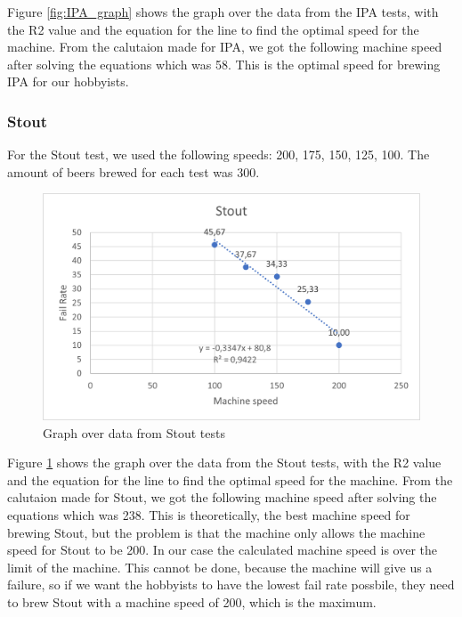 Figure \ref{fig:IPA_graph} shows the graph over the data from the IPA tests, with the R2 value and the equation for the line to find the optimal speed for the machine. \newline
From the calutaion made for IPA, we got the following machine speed after solving the equations which was 58. This is the optimal speed for brewing IPA for our hobbyists. \newline

\subsubsection{Stout}
For the Stout test, we used the following speeds: 200, 175, 150, 125, 100. The amount of beers brewed for each test was 300.

\begin{center}
    \centering
    \begin{figure}[H]
        \includegraphics[width=1\textwidth]{img/Stout_graph.png}
        \caption{Graph over data from Stout tests}
        \label{fig:Stout_graph}
    \end{figure}
\end{center}

Figure \ref{fig:Stout_graph} shows the graph over the data from the Stout tests, with the R2 value and the equation for the line to find the optimal speed for the machine. \newline
From the calutaion made for Stout, we got the following machine speed after solving the equations which was 238. This is theoretically, the best machine speed for brewing Stout, but the problem is that the machine only allows the machine speed for Stout to be 200.
In our case the calculated machine speed is over the limit of the machine. This cannot be done, because the machine will give us a failure, so if we want the hobbyists to have the lowest fail rate possbile, they need to brew Stout with a machine speed of 200, which is the maximum. \newline

